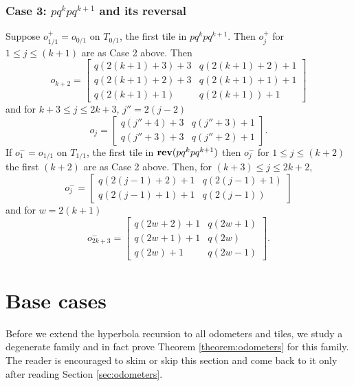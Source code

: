 \documentclass[12pt]{amsart}
\begin{document}
\subsubsection*{Case 3: $p q^{k} p q^{k+1}$ and its reversal}
Suppose $o_{1/1}^+ = o_{0/1}$ on $T_{0/1}$, the first tile in $p q^{k} p q^{k+1}$.  Then $o_{j}^+$ for $1 \leq j \leq (k+1)$ are as Case 2 above. 
Then 
\begin{equation}\label{eq:explicit-forms-bs-3-a}
o_{k+2} = 
\begin{bmatrix}
q(2(k+1) +3) +3 & q(2(k+1)+2) + 1 \\
q(2(k+1)+2)+3 & q(2(k+1)+1) + 1 \\
q(2(k+1)+1) & q(2(k+1))+1
\end{bmatrix}
\end{equation}
and for $k+3 \leq j \leq 2k +3$, $j'' = 2(j-2)$
\begin{equation}\label{eq:explicit-forms-bs-3-b}
o_{j} = 
\begin{bmatrix}
q(j''+4) + 3 & q(j''+3)+1 \\
q(j''+3) + 3 & q(j''+2) + 1 
\end{bmatrix}.
\end{equation}
If $o_1^{-} = o_{1/1}$ on $T_{1/1}$, the first tile in $\mathop{\bf rev}(p q^{k} p q^{k+1})$ then $o_{j}^-$ for $1 \leq j \leq (k+2)$ the first $(k+2)$ are as Case 2 above. 
Then, for $(k+3) \leq j \leq 2k+2$, 
\begin{equation}\label{eq:explicit-forms-bs-3-c}
o^-_{j} = 
\begin{bmatrix}
q(2(j-1) + 2) + 1 & q(2(j-1) + 1) \\
q(2(j-1) + 1) + 1 & q(2(j-1)) 
\end{bmatrix}
\end{equation}
and for $w = 2(k+1)$
\begin{equation}\label{eq:explicit-forms-bs-3-d}
o^-_{2k+3} = 
\begin{bmatrix}
q(2 w + 2) + 1 & q(2w + 1) \\
q(2w + 1) + 1 & q(2w) \\
q(2w) + 1 & q(2w-1) 
\end{bmatrix}.
\end{equation}





\section{Base cases} \label{sec:degenerate_cases}
Before we extend the hyperbola recursion to all odometers and tiles, 
we study a degenerate family and in fact prove Theorem \ref{theorem:odometers}
for this family. The reader is encouraged to skim or skip this section and come back to it only after 
reading Section \ref{sec:odometers}. 
\end{document}
